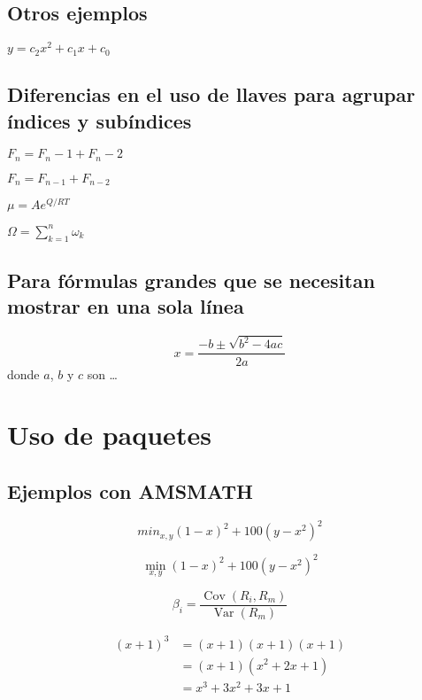 \documentclass[12pt,a4paper]{article}
\begin{document}
\subsection*{Otros ejemplos}

$y = c_2 x^2 + c_1 x + c_0$

\subsection*{Diferencias en el uso de llaves para agrupar índices y subíndices}

$F_n = F_n-1 + F_n-2$

$F_n = F_{n-1} + F_{n-2}$

$\mu = A e^{Q/RT}$

$\Omega=\sum_{k=1}^{n}\omega_k$

\subsection*{Para fórmulas grandes que se necesitan mostrar en una sola línea}

\begin{equation}
x = \frac{-b \pm \sqrt{b^2 - 4ac}}{2a}
\end{equation}
donde $a$, $b$ y $c$ son \ldots


\section*{Uso de paquetes}

\subsection*{Ejemplos con AMSMATH}

\begin{equation*}
min_{x,y}{(1-x)^2 + 100(y-x^2)^2} %
\end{equation*}

\begin{equation*}
\min_{x,y}{(1-x)^2 + 100(y-x^2)^2} %
\end{equation*}

\begin{equation*}
\beta_i=
\frac{\operatorname{Cov}(R_i, R_m)}
	 {\operatorname{Var}(R_m)}
\end{equation*}

\begin{align*}
(x+1)^3 &= (x+1)(x+1)(x+1)\\
		&= (x+1)(x^2 + 2x + 1)\\
		&= x^3 + 3x^2 + 3x + 1
\end{align*}
\end{document}
